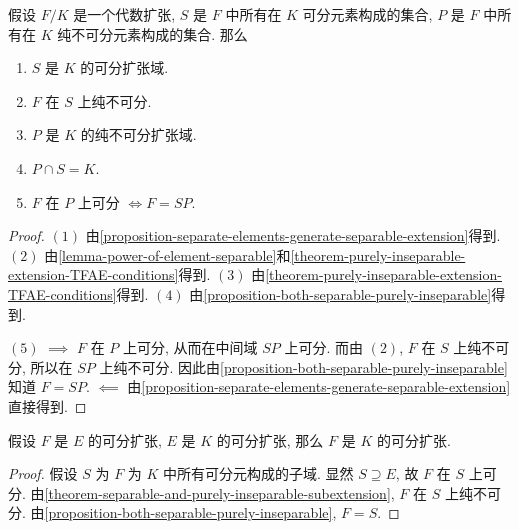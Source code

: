 \begin{theorem}
  \label{theorem-separable-and-purely-inseparable-subextension}
  假设 \( F/K \) 是一个代数扩张, \( S \) 是 \( F \) 中所有在 \( K \)
  可分元素构成的集合, \( P \) 是 \( F \) 中所有在 \( K \)
  纯不可分元素构成的集合.
  那么
  \begin{enumerate}
    \item \( S \) 是 \( K \) 的可分扩张域.
    \item \( F \) 在 \( S \) 上纯不可分.
    \item \( P \) 是 \( K \) 的纯不可分扩张域.
    \item \( P \cap S = K \).
    \item \( F \) 在 \( P \) 上可分 \( \iff F = SP \).
  \end{enumerate}
\end{theorem}
\begin{proof}
  \( (1) \)
  由\cref{proposition-separate-elements-generate-separable-extension}得到.
  \( (2) \)
  由\cref{lemma-power-of-element-separable}和\cref{theorem-purely-inseparable-extension-TFAE-conditions}得到.
  \( (3) \) 由\cref{theorem-purely-inseparable-extension-TFAE-conditions}得到.
  \( (4) \) 由\cref{proposition-both-separable-purely-inseparable}得到.

  \( (5) \) \( \implies \) \( F \) 在 \( P \) 上可分, 从而在中间域 \( SP \)
  上可分.
  而由 \( (2) \), \( F \) 在 \( S \) 上纯不可分, 所以在 \( SP \) 上纯不可分.
  因此由\cref{proposition-both-separable-purely-inseparable}知道 \( F = SP \).
  \( \impliedby \)
  由\cref{proposition-separate-elements-generate-separable-extension}直接得到.
\end{proof}

\begin{corollary}
  假设 \( F \) 是 \( E \) 的可分扩张, \( E \) 是 \( K \) 的可分扩张, 那么 \( F
  \) 是 \( K \) 的可分扩张.
\end{corollary}
\begin{proof}
  假设 \( S \) 为 \( F \) 为 \( K \) 中所有可分元构成的子域.
  显然 \( S \supseteq E \), 故 \( F \) 在 \( S \) 上可分.
  由\cref{theorem-separable-and-purely-inseparable-subextension}, \( F \) 在 \(
  S \) 上纯不可分.
  由\cref{proposition-both-separable-purely-inseparable}, \( F = S \).
\end{proof}

